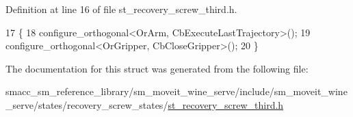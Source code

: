 Definition at line 16 of file st\+\_\+recovery\+\_\+screw\+\_\+third.\+h.


\begin{DoxyCode}
17             \{
18                 configure\_orthogonal<OrArm, CbExecuteLastTrajectory>();
19                 configure\_orthogonal<OrGripper, CbCloseGripper>();
20             \}
\end{DoxyCode}


The documentation for this struct was generated from the following file\+:\begin{DoxyCompactItemize}
\item 
smacc\+\_\+sm\+\_\+reference\+\_\+library/sm\+\_\+moveit\+\_\+wine\+\_\+serve/include/sm\+\_\+moveit\+\_\+wine\+\_\+serve/states/recovery\+\_\+screw\+\_\+states/\hyperlink{sm__moveit__wine__serve_2include_2sm__moveit__wine__serve_2states_2recovery__screw__states_2st__recovery__screw__third_8h}{st\+\_\+recovery\+\_\+screw\+\_\+third.\+h}\end{DoxyCompactItemize}
